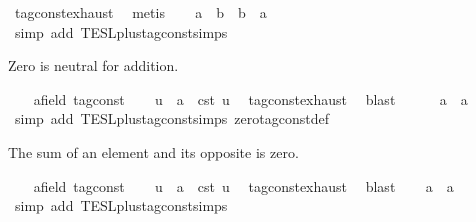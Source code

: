 \begin{isabellebody}
\ tag{\isacharunderscore}const{\isachardot}exhaust\ \isamarkupfalse%
\ metis\isanewline
\ \ \isamarkupfalse%
\ {\isacartoucheopen}a\ {\isacharplus}\ b\ {\isacharequal}\ b\ {\isacharplus}\ a{\isacartoucheclose}\isanewline
\ \ \ \ \isamarkupfalse%
\ {\isacharparenleft}simp\ add{\isacharcolon}\ TESL{\isachardot}plus{\isacharunderscore}tag{\isacharunderscore}const{\isachardot}simps{\isacharparenright}\isanewline
{}\isamarkupfalse%
%
\begin{isamarkuptext}%
Zero is neutral for addition.%
\end{isamarkuptext}\isamarkuptrue%
\ \ \isamarkupfalse%
\ a{\isacharcolon}{\isacharcolon}{\isacartoucheopen}{\isacharprime}{\isasymtau}{\isacharcolon}{\isacharcolon}field\ tag{\isacharunderscore}const{\isacartoucheclose}\isanewline
\ \ \isamarkupfalse%
\ u\ \ {\isacartoucheopen}a\ {\isacharequal}\ {\isasymtau}\isactrlsub c\isactrlsub s\isactrlsub t\ u{\isacartoucheclose}\ \isamarkupfalse%
\ tag{\isacharunderscore}const{\isachardot}exhaust\ \isamarkupfalse%
\ blast\isanewline
\ \ \isamarkupfalse%
\ {\isacartoucheopen}{}\ {\isacharplus}\ a\ {\isacharequal}\ a{\isacartoucheclose}\isanewline
\ \ \ \ \isamarkupfalse%
\ {\isacharparenleft}simp\ add{\isacharcolon}\ TESL{\isachardot}plus{\isacharunderscore}tag{\isacharunderscore}const{\isachardot}simps\ zero{\isacharunderscore}tag{\isacharunderscore}const{\isacharunderscore}def{\isacharparenright}\isanewline
{}\isamarkupfalse%
%
\begin{isamarkuptext}%
The sum of an element and its opposite is zero.%
\end{isamarkuptext}\isamarkuptrue%
\ \ \isamarkupfalse%
\ a{\isacharcolon}{\isacharcolon}{\isacartoucheopen}{\isacharprime}{\isasymtau}{\isacharcolon}{\isacharcolon}field\ tag{\isacharunderscore}const{\isacartoucheclose}\isanewline
\ \ \isamarkupfalse%
\ u\ \ {\isacartoucheopen}a\ {\isacharequal}\ {\isasymtau}\isactrlsub c\isactrlsub s\isactrlsub t\ u{\isacartoucheclose}\ \isamarkupfalse%
\ tag{\isacharunderscore}const{\isachardot}exhaust\ \isamarkupfalse%
\ blast\isanewline
\ \ \isamarkupfalse%
\ {\isacartoucheopen}{\isacharminus}a\ {\isacharplus}\ a\ {\isacharequal}\ {}{\isacartoucheclose}\isanewline
\ \ \ \ \isamarkupfalse%
\ {\isacharparenleft}simp\ add{\isacharcolon}\ TESL{\isachardot}plus{\isacharunderscore}tag{\isacharunderscore}const{\isachardot}simps\isanewline

\end{isabellebody}
